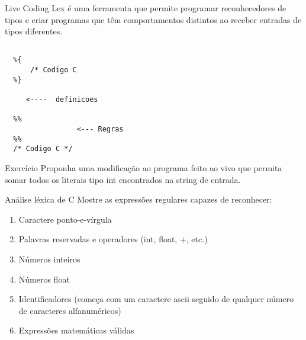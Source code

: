 \documentclass{beamer}
\begin{document}
\begin{frame}[fragile]{Live Coding}
  \centering
  \large
  Lex é uma ferramenta que permite programar reconhecedores de tipos e criar
  programas que têm comportamentos distintos ao receber entradas de tipos
  diferentes.
  \begin{verbatim}

  %{
      /* Codigo C
  %}

     <----  definicoes

  %%
                 <--- Regras
  %%
  /* Codigo C */

  \end{verbatim}

\end{frame}

\begin{frame}{Exercício}
  \centering
  \large
  Proponha uma modificação ao programa feito ao vivo que permita somar todos os
  literais tipo int encontrados na string de entrada.
\end{frame}

\begin{frame}{Análise léxica de C}
\large
Mostre as expressões regulares capazes de reconhecer:
  \begin{enumerate}
    \item Caractere ponto-e-vírgula
    \item Palavras reservadas e operadores (int, float, +,  etc.)
    \item Números inteiros
    \item Números float
    \item Identificadores (começa com um caractere ascii seguido de qualquer
      número de caracteres alfanuméricos)
    \item Expressões matemáticas válidas
  \end{enumerate}

\end{frame}
\end{document}
